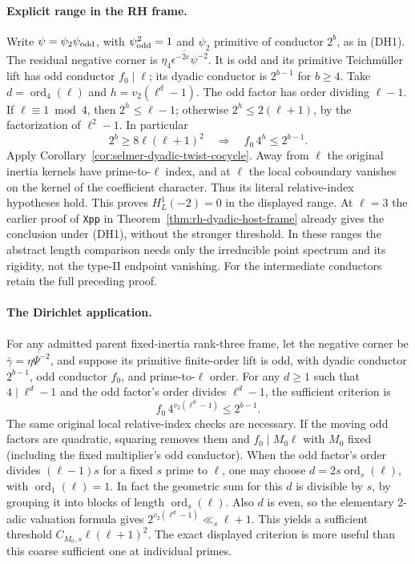 \paragraph{Explicit range in the RH frame.}
Write \(\psi=\psi_2\psi_{\rm odd}\), with
\(\psi_{\rm odd}^2=1\) and \(\psi_2\) primitive of conductor
\(2^b\), as in (DH1).  The residual negative corner
is \(\overline{\eta_4\epsilon^{-2e}\psi^{-2}}\).
It is odd and its primitive Teichm\"uller lift has odd
conductor \(f_0\mid\ell\); its dyadic conductor is
\(2^{b-1}\) for \(b\ge4\).
Take \(d=\operatorname{ord}_4(\ell)\) and
\(h=v_2(\ell^d-1)\).
The odd factor has order dividing \(\ell-1\).
If \(\ell\equiv1\bmod4\), then \(2^h\le\ell-1\);
otherwise \(2^h\le2(\ell+1)\), by the factorization
of \(\ell^2-1\).
In particular
\[
            2^b\ge8\ell(\ell+1)^2
       \quad\Longrightarrow\quad
            f_0\,4^h\le 2^{b-1}.
\]
Apply Corollary~\ref{cor:selmer-dyadic-twist-cocycle}.
Away from \(\ell\) the original inertia kernels have
prime-to-\(\ell\) index, and at \(\ell\) the local
coboundary vanishes on the kernel of the coefficient
character.  Thus its literal relative-index hypotheses
hold.  This proves \(H^1_L(-2)=0\) in the displayed range.
At \(\ell=3\) the earlier proof of \texttt{Xpp}
in Theorem~\ref{thm:rh-dyadic-host-frame} already gives
the conclusion under (DH1), without the stronger
threshold.  In these ranges the abstract length comparison
needs only the irreducible point spectrum and its rigidity,
not the type-II endpoint vanishing.  For the intermediate
conductors retain the full preceding proof.

\paragraph{The Dirichlet application.}
For any admitted parent fixed-inertia rank-three frame,
let the negative corner be
\(\bar\gamma=\overline{\eta\Psi^{-2}}\), and suppose
its primitive finite-order lift is odd, with dyadic
conductor \(2^{b-1}\), odd conductor \(f_0\), and
prime-to-\(\ell\) order.  For any \(d\ge1\) such that
\(4\mid\ell^d-1\) and the odd factor's order divides
\(\ell^d-1\), the sufficient criterion is
\[
                      f_0\,4^{v_2(\ell^d-1)}\le 2^{b-1}.
\]
The same original local relative-index checks are
necessary.  If the moving odd factors are quadratic,
squaring removes them and \(f_0\mid M_0\ell\) with
\(M_0\) fixed (including the fixed multiplier's odd
conductor).  When the odd factor's order divides
\((\ell-1)s\) for a fixed \(s\) prime to \(\ell\), one
may choose \(d=2s\operatorname{ord}_s(\ell)\), with
\(\operatorname{ord}_1(\ell)=1\).  In fact the geometric
sum for this \(d\) is divisible by \(s\), by grouping
it into blocks of length \(\operatorname{ord}_s(\ell)\).
Also \(d\) is even, so the elementary 2-adic valuation
formula gives \(2^{v_2(\ell^d-1)}\ll_s\ell+1\).
This yields a sufficient threshold
\(C_{M_0,s}\ell(\ell+1)^2\).
The exact displayed criterion is more useful than this
coarse sufficient one at individual primes.

